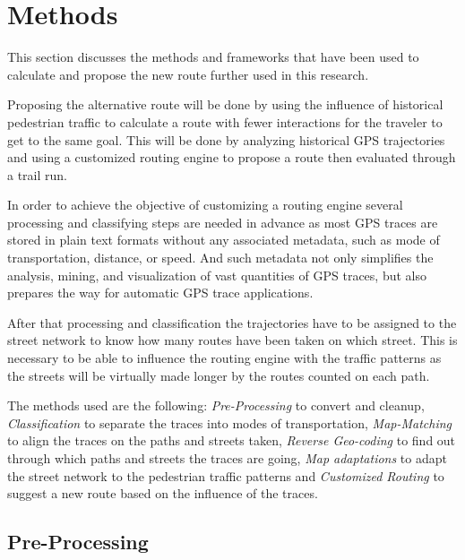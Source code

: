 \autocite[]{Sevtsuk2021}

\autocite[]{Delling2012}
\autocite[]{Hashemi2017}
\autocite[]{Qiu2015}
\autocite[]{Hendawi2019}
\autocite[]{Huber2016}

\autocite[]{Zhang2012}

\section{Methods}

This section discusses the methods and frameworks that have been used to calculate and propose the new route further used in this research. 

Proposing the alternative route will be done by using the influence of historical pedestrian traffic to calculate a route with fewer interactions for the traveler to get to the same goal. This will be done by analyzing historical GPS trajectories and using a customized routing engine to propose a route then evaluated through a trail run. 

In order to achieve the objective of customizing a routing engine several processing and classifying steps are needed in advance as most GPS traces are stored in plain text formats without any associated metadata, such as mode of transportation, distance, or speed. And such metadata not only simplifies the analysis, mining, and visualization of vast quantities of GPS traces, but also prepares the way for automatic GPS trace applications. \autocite[]{Hashemi2017}

After that processing and classification the trajectories have to be assigned to the street network to know how many routes have been taken on which street. This is necessary to be able to influence the routing engine with the traffic patterns as the streets will be virtually made longer by the routes counted on each path.

The methods used are the following: \textit{Pre-Processing} to convert and cleanup, \textit{Classification} to separate the traces into modes of transportation, \textit{Map-Matching} to align the traces on the paths and streets taken, \textit{Reverse Geo-coding} to find out through which paths and streets the traces are going, \textit{Map adaptations} to adapt the street network to the pedestrian traffic patterns and \textit{Customized Routing} to suggest a new route based on the influence of the traces.

\subsection{Pre-Processing}

